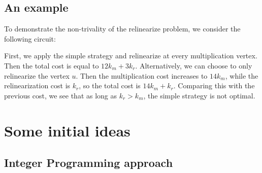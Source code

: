 \documentclass[11pt]{article} %
\theoremstyle{plain}
\theoremstyle{definition}
\begin{document}
\subsection{An example} \label{sec: example} 
To demonstrate the non-trivality of the relinearize problem,  we consider the following circuit: 
\begin{center}
\end{center}

First, we apply the simple strategy and relinearize at every multiplication vertex. Then the total cost is equal to $12 k_m + 3k_r$. Alternatively, we can choose to only relinearize the vertex $u$. Then the multiplication cost increases to $14k_m$, while the relinearization cost is $k_r$, so the total cost is $14k_m + k_r$. Comparing this with the previous cost, we see that as long as  $k_r > k_m$, the simple strategy is not optimal. 






\iffalse
\section{Some initial ideas}

\subsection{Integer Programming approach}
\end{document}

